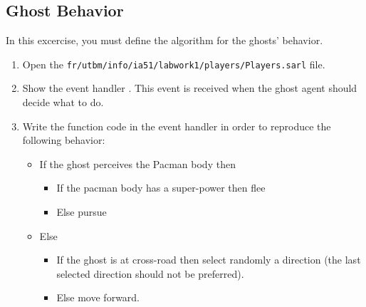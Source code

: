 \documentclass[article,english,nodocumentinfo]{utbmciadreport}
\begin{document}
\subsection{Ghost Behavior}

In this excercise, you must define the algorithm for the ghosts' behavior.
\begin{enumerate}
\item Open the \texttt{fr/utbm/info/ia51/labwork1/players/Players.sarl} file.
\item Show the event handler . This event is received when the ghost agent should decide what to do.
\item Write the function code in the event handler in order to reproduce the following behavior:
	\begin{itemize}
	\item If the ghost perceives the Pacman body then
		\begin{itemize}
		\item If the pacman body has a super-power then flee
		\item Else pursue
		\end{itemize}
	\item Else
		\begin{itemize}
		\item If the ghost is at cross-road then select randomly a direction (the last selected direction should not be preferred).
		\item Else move forward.
		\end{itemize}
	\end{itemize}
\end{enumerate}
\end{document}
